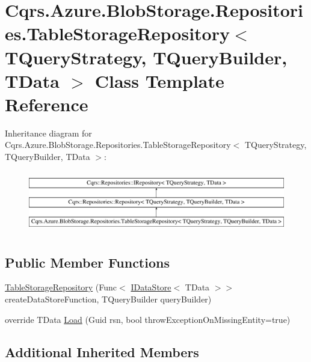 \hypertarget{classCqrs_1_1Azure_1_1BlobStorage_1_1Repositories_1_1TableStorageRepository}{}\section{Cqrs.\+Azure.\+Blob\+Storage.\+Repositories.\+Table\+Storage\+Repository$<$ T\+Query\+Strategy, T\+Query\+Builder, T\+Data $>$ Class Template Reference}
\label{classCqrs_1_1Azure_1_1BlobStorage_1_1Repositories_1_1TableStorageRepository}
Inheritance diagram for Cqrs.\+Azure.\+Blob\+Storage.\+Repositories.\+Table\+Storage\+Repository$<$ T\+Query\+Strategy, T\+Query\+Builder, T\+Data $>$\+:\begin{figure}[H]
\begin{center}
\leavevmode
\includegraphics[height=2.722852cm]{classCqrs_1_1Azure_1_1BlobStorage_1_1Repositories_1_1TableStorageRepository}
\end{center}
\end{figure}
\subsection*{Public Member Functions}
\begin{DoxyCompactItemize}
\item 
\hyperlink{classCqrs_1_1Azure_1_1BlobStorage_1_1Repositories_1_1TableStorageRepository_a2c98507c1cdd4ed740a8d881a4e779e1_a2c98507c1cdd4ed740a8d881a4e779e1}{Table\+Storage\+Repository} (Func$<$ \hyperlink{interfaceCqrs_1_1DataStores_1_1IDataStore}{I\+Data\+Store}$<$ T\+Data $>$$>$ create\+Data\+Store\+Function, T\+Query\+Builder query\+Builder)
\item 
override T\+Data \hyperlink{classCqrs_1_1Azure_1_1BlobStorage_1_1Repositories_1_1TableStorageRepository_a7238452f19c9d51b5733df7701920605_a7238452f19c9d51b5733df7701920605}{Load} (Guid rsn, bool throw\+Exception\+On\+Missing\+Entity=true)
\end{DoxyCompactItemize}
\subsection*{Additional Inherited Members}


